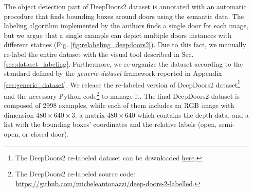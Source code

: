 The object detection part of DeepDoors2 dataset is annotated with an automatic procedure that finds bounding boxes around doors using the semantic data. The labeling algorithm implemented by the authors finds a single door for each image, but we argue that a single example can depict multiple doors instances with different statues (Fig. \ref{fig:relabeling_deepdoors2}). Due to this fact, we manually re-label the entire dataset with the visual tool described in Sec. \ref{sec:dataset_labeling}. Furthermore, we re-organize the dataset according to the standard defined by the \textit{generic-dataset} framework reported in Appendix \ref{sec:generic_dataset}. We release the re-labeled version of DeepDoors2 dataset\footnote{The DeepDoors2 re-labeled dataset can be downloaded \href{https://drive.google.com/file/d/1wSmFUHF9aSJkomwFdOmepMevBvkRpf3D/view?usp=sharing}{here}.} and the necessary Python code\footnote{The DeepDoors2 re-labeled source code: \url{https://github.com/micheleantonazzi/deep-doors-2-labelled}.} to manage it. The final DeepDoors2 dataset is composed of 2998 examples, while each of them includes an RGB image with dimension $480 \times 640 \times 3$, a matrix $480 \times 640$ which contains the depth data, and a list with the bounding boxes' coordinates and the relative labels (open, semi-open, or closed door). 


